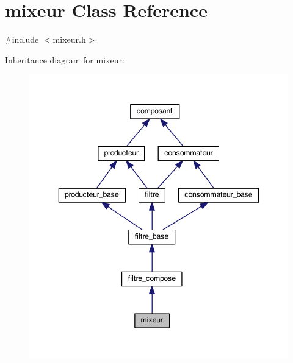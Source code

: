 \hypertarget{classmixeur}{\section{mixeur Class Reference}
\label{classmixeur}
}


{\ttfamily \#include $<$mixeur.\-h$>$}



Inheritance diagram for mixeur\-:
\nopagebreak
\begin{figure}[H]
\begin{center}
\leavevmode
\includegraphics[width=346pt]{classmixeur__inherit__graph}
\end{center}
\end{figure}


